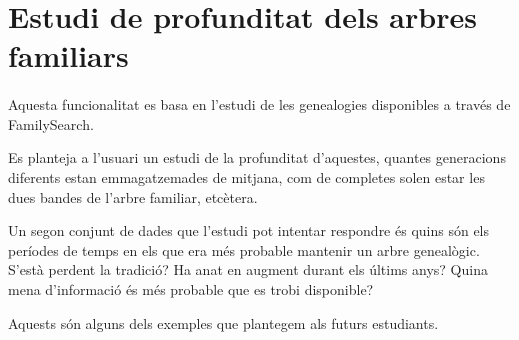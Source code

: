 \section{Estudi de profunditat dels arbres familiars}

    \paragraph{}
    Aquesta funcionalitat es basa en l'estudi de les genealogies disponibles a través de FamilySearch.

    Es planteja a l'usuari un estudi de la profunditat d'aquestes, quantes generacions diferents estan emmagatzemades de mitjana, com de completes solen estar les dues bandes de l'arbre familiar, etcètera.

    Un segon conjunt de dades que l'estudi pot intentar respondre és quins són els períodes de temps en els que era més probable mantenir un arbre genealògic. S'està perdent la tradició? Ha anat en augment durant els últims anys? Quina mena d'informació és més probable que es trobi disponible?

    Aquests són alguns dels exemples que plantegem als futurs estudiants.
